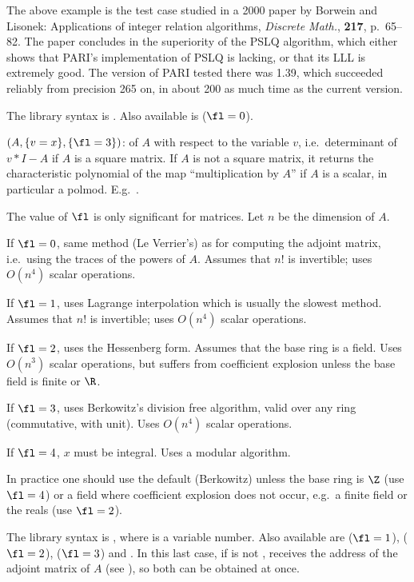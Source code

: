 The above example is the test case studied in a 2000 paper by Borwein and
Lisonek: Applications of integer relation algorithms, \emph{Discrete Math.},
{\bf 217}, p.~65--82. The paper concludes in the superiority of the PSLQ
algorithm, which either shows that PARI's implementation of PSLQ is lacking,
or that its LLL is extremely good. The version of PARI tested there was
1.39, which succeeded reliably from precision 265 on, in about 200 as much
time as the current version.

The library syntax is .
Also available is  ($\fl=0$).

$(A,\{v=x\},\{\fl=3\})$: \label{se:charpoly}
of $A$ with respect to the variable $v$, i.e.~determinant of $v*I-A$ if $A$
is a square matrix. If $A$ is not a square matrix, it returns the
characteristic polynomial of the map ``multiplication by $A$'' if $A$ is a
scalar, in particular a polmod. E.g.~.

The value of $\fl$ is only significant for matrices. Let $n$ be the dimension
of $A$.

If $\fl=0$, same method (Le Verrier's) as for computing the adjoint matrix,
i.e.~using the traces of the powers of $A$. Assumes that $n!$ is
invertible; uses $O(n^4)$ scalar operations.

If $\fl=1$, uses Lagrange interpolation which is usually the slowest method.
Assumes that $n!$ is invertible; uses $O(n^4)$ scalar operations.

If $\fl=2$, uses the Hessenberg form. Assumes that the base ring is a field.
Uses $O(n^3)$ scalar operations, but suffers from coefficient explosion
unless the base field is finite or $\R$.

If $\fl=3$, uses Berkowitz's division free algorithm, valid over any
ring (commutative, with unit). Uses $O(n^4)$ scalar operations.

If $\fl=4$, $x$ must be integral. Uses a modular algorithm.

In practice one should use the default (Berkowitz) unless the base ring is
$\Z$ (use $\fl=4$) or a field where coefficient explosion does not occur,
e.g.~a finite field or the reals (use $\fl=2$).

The library syntax is , where  is a variable number.
Also available are  ($\fl=1$),
 ($\fl=2$),  ($\fl=3$) and . In this
last case, if  is not ,  receives the address of
the adjoint matrix of $A$ (see ), so both can be obtained at
once.

